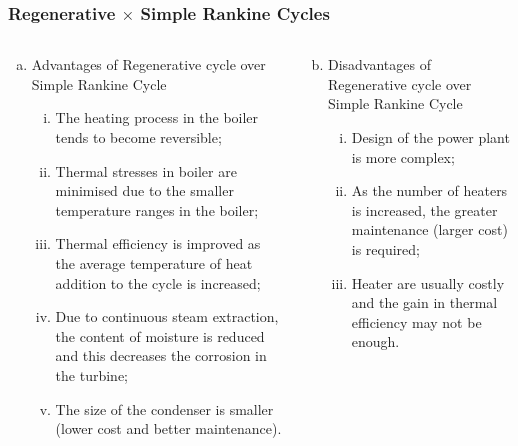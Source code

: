 \documentclass[10pt,compress,handout,ignorenonframetext]{beamer}
\begin{document}
\begin{frame}
 \frametitle{Regenerative $\times$ Simple Rankine Cycles}
  \begin{columns}
   \begin{column}[c]{0.5\linewidth}
    \begin{enumerate}[(a)]
     \item<1-> Advantages of Regenerative cycle over Simple Rankine Cycle
     \begin{enumerate} [(i)]%
      \item<1-> The heating process in the boiler tends to become reversible;
      \item<1-> Thermal stresses in boiler are minimised due to the smaller temperature ranges in the boiler;
      \item<1-> Thermal efficiency is improved as the average temperature of heat addition to the cycle is increased;
      \item<1-> Due to continuous steam extraction, the content of moisture is reduced and this decreases the corrosion in the turbine;
      \item<1-> The size of the condenser is smaller (lower cost and better maintenance).
     \end{enumerate}
    \end{enumerate} 
   \end{column}
%
   \begin{column}[c]{0.5\linewidth}  
    \begin{enumerate}[(a)]\setcounter{enumi}{1}
     \item<2-> Disadvantages of Regenerative cycle over Simple Rankine Cycle
     \begin{enumerate}[(i)] %
      \item<2-> Design of the power plant is more complex;
      \item<2-> As the number of heaters is increased, the greater maintenance (larger cost) is required;
      \item<2-> Heater are usually costly and the gain in thermal efficiency may not be enough. 
     \end{enumerate}
    \end{enumerate} 
   \end{column}
  \end{columns}
  
\end{frame}
 
\end{document}
